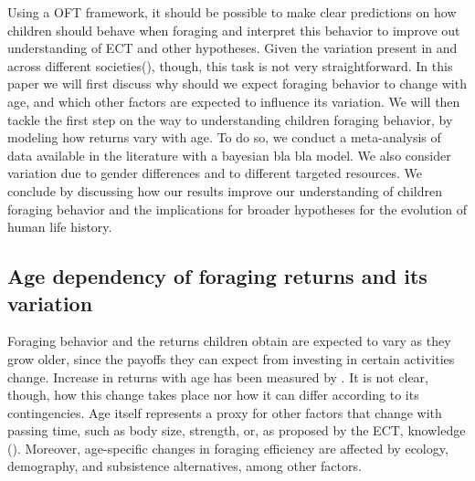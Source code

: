 Using a OFT framework, it should be possible to make clear predictions on how children should behave when foraging and interpret this behavior to improve out understanding of ECT and other hypotheses. Given the variation present in and across different societies(\cite{koster_life_2020, }), %
though, this task is not very straightforward. In this paper we will first discuss why should we expect foraging behavior to change with age, and which other factors are expected to influence its variation. We will then tackle the first step on the way to understanding children foraging behavior, by modeling how returns vary with age. To do so, we conduct a meta-analysis of data available in the literature with a bayesian bla bla model. We also consider variation due to gender differences and to different targeted resources. We conclude by discussing how our results improve our understanding of children foraging behavior and the implications for broader hypotheses for the evolution of human life history. 

\subsection{Age dependency of foraging returns and its variation}
Foraging behavior and the returns children obtain are expected to vary as they grow older, since the payoffs they can expect from investing in certain activities change. Increase in returns with age has been measured by \cite{bird_constraints_2002, crittenden_juvenile_2013}. %
It is not clear, though, how this change takes place nor how it can differ according to its contingencies. Age itself represents a proxy for other factors that change with passing time, such as body size, strength, or, as proposed by the ECT, knowledge (\cite{bird_children_2002}). Moreover, age-specific changes in foraging efficiency are affected by ecology, demography, and subsistence alternatives, among other factors. 


